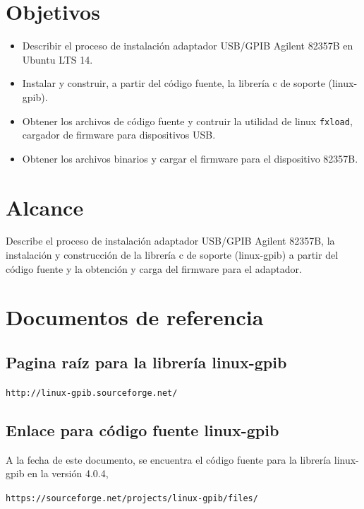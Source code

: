 \documentclass[paper=letter,oneside,fontsize=11pt]{article}
\begin{document}
	\clearpage
	
	\tableofcontents
	
	\section{Objetivos}
		\begin{itemize}
			\item  Describir el proceso de instalación adaptador USB/GPIB Agilent 82357B en Ubuntu LTS 14.
			\item Instalar y construir, a partir del código fuente, la librería c de soporte (linux-gpib).
			\item Obtener los archivos de código fuente y contruir la utilidad de linux \texttt{fxload}, cargador de firmware para dispositivos USB.
			\item Obtener los archivos binarios y cargar el firmware para el dispositivo 82357B.
		\end{itemize}
		
	\section{Alcance}
	
		Describe el proceso de instalación adaptador USB/GPIB Agilent 82357B, la instalación y construcción de la librería c de soporte (linux-gpib) a partir del código fuente y la obtención y carga del firmware para el adaptador.	
		
	\section{Documentos de referencia}

	\subsection{Pagina raíz para la librería linux-gpib}	
	
	\texttt{http://linux-gpib.sourceforge.net/}
	
	\subsection{Enlace para código fuente linux-gpib}
	
	A la fecha de este documento, se encuentra el código fuente para la librería linux-gpib en la versión 4.0.4,	
	
	\texttt{https://sourceforge.net/projects/linux-gpib/files/}
\end{document}
